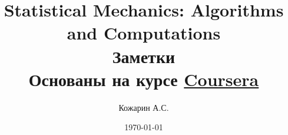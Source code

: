\title{
    Statistical Mechanics: Algorithms and Computations \\
    Заметки \\
    Основаны на курсе \href{https://www.coursera.org/learn/statistical-mechanics}{Coursera} \cite{original_course}
}
\author{Кожарин А.С.}
\date{\today}
